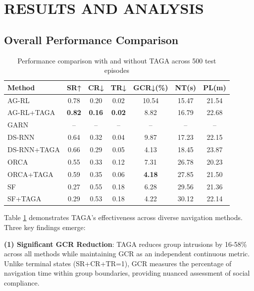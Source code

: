 \section{RESULTS AND ANALYSIS}


\subsection{Overall Performance Comparison}

\begin{table}[t]
\caption{Performance comparison with and without TAGA across 500 test episodes}
\label{table:main-results}
\centering
\begin{tabular}{lcccccc}
\hline
\textbf{Method} & \textbf{SR↑} & \textbf{CR↓} & \textbf{TR↓} & \textbf{GCR↓(\%)} & \textbf{NT(s)} & \textbf{PL(m)} \\
\hline
AG-RL & 0.78 & 0.20 & 0.02 & 10.54 & 15.47 & 21.54 \\
AG-RL+TAGA & \textbf{0.82} & \textbf{0.16} & \textbf{0.02} & 8.82 & 16.79 & 22.68 \\
\hline
GARN~\cite{garn2025} & -- & -- & -- & -- & -- & -- \\
\hline
DS-RNN & 0.64 & 0.32 & 0.04 & 9.87 & 17.23 & 22.15 \\
DS-RNN+TAGA & 0.66 & 0.29 & 0.05 & 4.13 & 18.45 & 23.87 \\
\hline
ORCA & 0.55 & 0.33 & 0.12 & 7.31 & 26.78 & 20.23 \\
ORCA+TAGA & 0.59 & 0.35 & 0.06 & \textbf{4.18} & 27.85 & 21.50 \\
\hline
SF & 0.27 & 0.55 & 0.18 & 6.28 & 29.56 & 21.36 \\
SF+TAGA & 0.29 & 0.53 & 0.18 & 4.22 & 30.12 & 22.14 \\
\hline
\end{tabular}
\end{table}

Table \ref{table:main-results} demonstrates TAGA's effectiveness across diverse navigation methods. Three key findings emerge:

\textbf{(1) Significant GCR Reduction}: TAGA reduces group intrusions by 16-58\% across all methods while maintaining GCR as an independent continuous metric. Unlike terminal states (SR+CR+TR=1), GCR measures the percentage of navigation time within group boundaries, providing nuanced assessment of social compliance.

